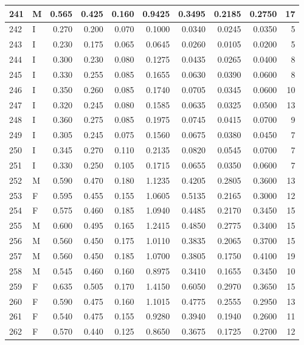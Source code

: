 \documentclass[9pt,twocolumn,twoside,]{pnas-new}
\begin{document}
\begin{tabular}{l|l|r|r|r|r|r|r|r|r}
\hline
241 & M & 0.565 & 0.425 & 0.160 & 0.9425 & 0.3495 & 0.2185 & 0.2750 & 17\\
\hline
242 & I & 0.270 & 0.200 & 0.070 & 0.1000 & 0.0340 & 0.0245 & 0.0350 & 5\\
\hline
243 & I & 0.230 & 0.175 & 0.065 & 0.0645 & 0.0260 & 0.0105 & 0.0200 & 5\\
\hline
244 & I & 0.300 & 0.230 & 0.080 & 0.1275 & 0.0435 & 0.0265 & 0.0400 & 8\\
\hline
245 & I & 0.330 & 0.255 & 0.085 & 0.1655 & 0.0630 & 0.0390 & 0.0600 & 8\\
\hline
246 & I & 0.350 & 0.260 & 0.085 & 0.1740 & 0.0705 & 0.0345 & 0.0600 & 10\\
\hline
247 & I & 0.320 & 0.245 & 0.080 & 0.1585 & 0.0635 & 0.0325 & 0.0500 & 13\\
\hline
248 & I & 0.360 & 0.275 & 0.085 & 0.1975 & 0.0745 & 0.0415 & 0.0700 & 9\\
\hline
249 & I & 0.305 & 0.245 & 0.075 & 0.1560 & 0.0675 & 0.0380 & 0.0450 & 7\\
\hline
250 & I & 0.345 & 0.270 & 0.110 & 0.2135 & 0.0820 & 0.0545 & 0.0700 & 7\\
\hline
251 & I & 0.330 & 0.250 & 0.105 & 0.1715 & 0.0655 & 0.0350 & 0.0600 & 7\\
\hline
252 & M & 0.590 & 0.470 & 0.180 & 1.1235 & 0.4205 & 0.2805 & 0.3600 & 13\\
\hline
253 & F & 0.595 & 0.455 & 0.155 & 1.0605 & 0.5135 & 0.2165 & 0.3000 & 12\\
\hline
254 & F & 0.575 & 0.460 & 0.185 & 1.0940 & 0.4485 & 0.2170 & 0.3450 & 15\\
\hline
255 & M & 0.600 & 0.495 & 0.165 & 1.2415 & 0.4850 & 0.2775 & 0.3400 & 15\\
\hline
256 & M & 0.560 & 0.450 & 0.175 & 1.0110 & 0.3835 & 0.2065 & 0.3700 & 15\\
\hline
257 & M & 0.560 & 0.450 & 0.185 & 1.0700 & 0.3805 & 0.1750 & 0.4100 & 19\\
\hline
258 & M & 0.545 & 0.460 & 0.160 & 0.8975 & 0.3410 & 0.1655 & 0.3450 & 10\\
\hline
259 & F & 0.635 & 0.505 & 0.170 & 1.4150 & 0.6050 & 0.2970 & 0.3650 & 15\\
\hline
260 & F & 0.590 & 0.475 & 0.160 & 1.1015 & 0.4775 & 0.2555 & 0.2950 & 13\\
\hline
261 & F & 0.540 & 0.475 & 0.155 & 0.9280 & 0.3940 & 0.1940 & 0.2600 & 11\\
\hline
262 & F & 0.570 & 0.440 & 0.125 & 0.8650 & 0.3675 & 0.1725 & 0.2700 & 12\\

\end{tabular}
\end{document}

